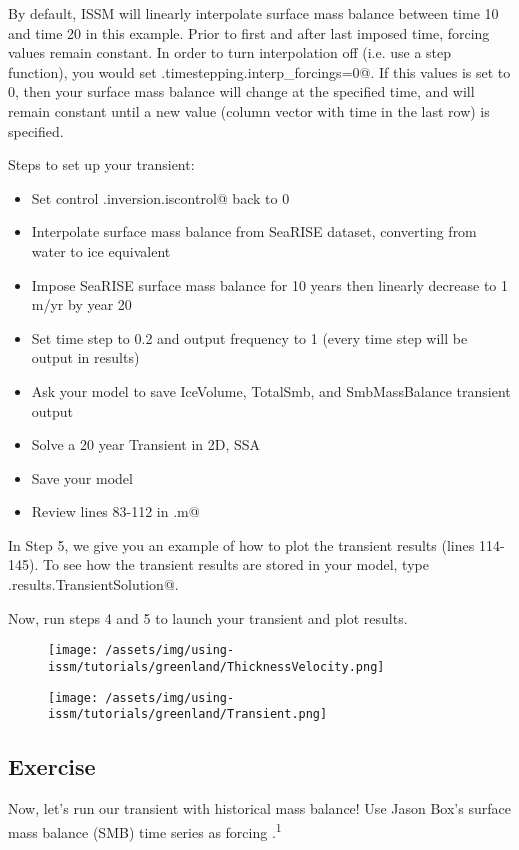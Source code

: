 By default, ISSM will linearly interpolate surface mass balance between time 10 and time 20 in this example. Prior to first and after last imposed time, forcing values remain constant. In order to turn interpolation off (i.e. use a step function), you would set \verb@md.timestepping.interp_forcings=0@. If this values is set to 0, then your surface mass balance will change at the specified time, and will remain constant until a new value (column vector with time in the last row) is specified.

Steps to set up your transient:
\begin{itemize}
	\item Set control \verb@md.inversion.iscontrol@ back to 0
	\item Interpolate surface mass balance from SeaRISE dataset, converting from water to ice equivalent
	\item Impose SeaRISE surface mass balance for 10 years then linearly decrease to 1 m/yr by year 20
	\item Set time step to 0.2 and output frequency to 1 (every time step will be output in results)
	\item Ask your model to save IceVolume, TotalSmb, and SmbMassBalance transient output
	\item Solve a 20 year Transient in 2D, SSA
	\item Save your model
	\item Review lines 83-112 in \verb@runme.m@
\end{itemize}

In Step 5, we give you an example of how to plot the transient results (lines 114-145). To see how the transient results are stored in your model, type \verb@md.results.TransientSolution@.

Now, run steps 4 and 5 to launch your transient and plot results.
\begin{figure}[H]
	\begin{center}
		\texttt{[image: /assets/img/using-issm/tutorials/greenland/ThicknessVelocity.png]}
	\end{center}
\end{figure}

\begin{figure}[H]
	\begin{center}
		\texttt{[image: /assets/img/using-issm/tutorials/greenland/Transient.png]}
	\end{center}
\end{figure}
\subsection{Exercise} %
Now, let's run our transient with historical mass balance! Use Jason Box's surface mass balance (SMB) time series as forcing \citep{Box2013a,Box2013b,Box2013c}.\textsuperscript{1}


